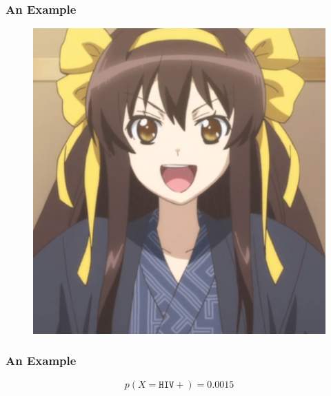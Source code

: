 \documentclass[notheorems, aspectratio=54]{beamer}
\begin{document}
\begin{frame}
    \frametitle{An Example}

    \begin{figure}
        \includegraphics[width=1.0\textwidth]{figures/tuanzhang.png}
    \end{figure}
    
\end{frame}


\begin{frame}
    \frametitle{An Example}


    $$
    p(X = \mathtt{HIV+}) = 0.0015
    $$
\end{frame}
\end{document}
